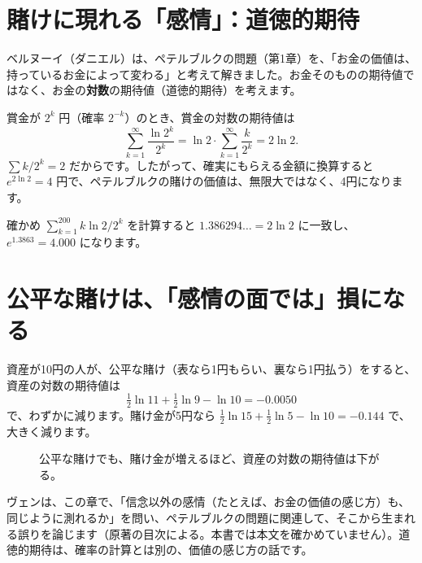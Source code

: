 \documentclass[a4paper,11pt,openany]{ltjsbook}
\begin{document}
\section{賭けに現れる「感情」：道徳的期待}

ベルヌーイ（ダニエル）は、ペテルブルクの問題（第1章）を、「お金の価値は、持っているお金によって変わる」と考えて解きました。お金そのものの期待値ではなく、お金の\textbf{対数}の期待値（道徳的期待）を考えます。

賞金が $2^k$ 円（確率 $2^{-k}$）のとき、賞金の対数の期待値は
\[
\sum_{k=1}^{\infty}\frac{\ln 2^k}{2^k}=\ln2\cdot\sum_{k=1}^{\infty}\frac{k}{2^k}=2\ln2 .
\]
$\sum k/2^k=2$ だからです。したがって、確実にもらえる金額に換算すると $e^{2\ln2}=4$ 円で、ペテルブルクの賭けの価値は、無限大ではなく、4円になります。

\begin{examplebox}{確かめ}
$\sum_{k=1}^{200}k\ln2/2^k$ を計算すると $1.386294\ldots=2\ln2$ に一致し、$e^{1.3863}=4.000$ になります。
\end{examplebox}

\section{公平な賭けは、「感情の面では」損になる}

資産が10円の人が、公平な賭け（表なら1円もらい、裏なら1円払う）をすると、資産の対数の期待値は
\[
\tfrac12\ln11+\tfrac12\ln9-\ln10=-0.0050
\]
で、わずかに減ります。賭け金が5円なら $\tfrac12\ln15+\tfrac12\ln5-\ln10=-0.144$ で、大きく減ります。

\begin{figure}[htbp]
\centering
{}
\caption{公平な賭けでも、賭け金が増えるほど、資産の対数の期待値は下がる。}
\end{figure}

ヴェンは、この章で、「信念以外の感情（たとえば、お金の価値の感じ方）も、同じように測れるか」を問い、ペテルブルクの問題に関連して、そこから生まれる誤りを論じます（原著の目次による。本書では本文を確かめていません）。道徳的期待は、確率の計算とは別の、価値の感じ方の話です。
\end{document}
